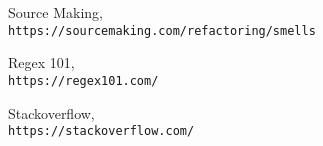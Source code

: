 \begin{thebibliography}{9}
Source Making, \\
\texttt{https://sourcemaking.com/refactoring/smells}

Regex 101, \\
\texttt{https://regex101.com/}

Stackoverflow, \\
\texttt{https://stackoverflow.com/}

\end{thebibliography}